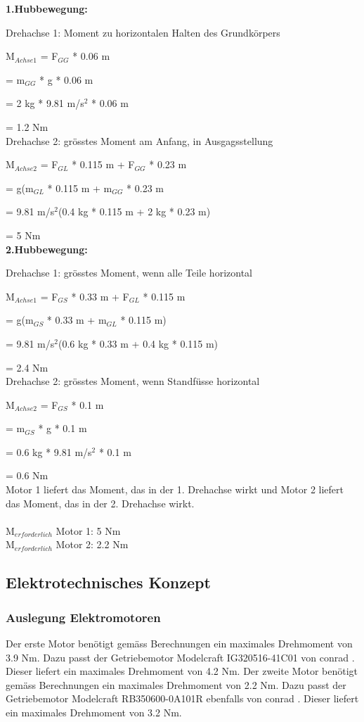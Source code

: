 \textbf{1.Hubbewegung:}

Drehachse 1: Moment zu horizontalen Halten des Grundkörpers

M$_{Achse 1}$ = F$_{GG}$ * 0.06 m

= m$_{GG}$ * g * 0.06 m

= 2 kg * 9.81 m/s$^{2}$ * 0.06 m

= 1.2 Nm\\

Drehachse 2: grösstes Moment am Anfang, in Ausgagsstellung

M$_{Achse 2}$ = F$_{GL}$ * 0.115 m + F$_{GG}$ * 0.23 m

= g(m$_{GL}$ * 0.115 m + m$_{GG}$ * 0.23 m

= 9.81 m/s$^{2}$(0.4 kg * 0.115 m + 2 kg * 0.23 m)

= 5 Nm\\

\textbf{2.Hubbewegung:}

Drehachse 1: grösstes Moment, wenn alle Teile horizontal

M$_{Achse 1}$ = F$_{GS}$ * 0.33 m + F$_{GL}$ * 0.115 m

= g(m$_{GS}$ * 0.33 m + m$_{GL}$ * 0.115 m)

= 9.81 m/s$^{2}$(0.6 kg * 0.33 m + 0.4 kg * 0.115 m)

= 2.4 Nm\\

Drehachse 2: grösstes Moment, wenn Standfüsse horizontal

M$_{Achse 2}$ = F$_{GS}$ * 0.1 m

= m$_{GS}$ * g * 0.1 m

= 0.6 kg * 9.81 m/s$^{2}$ * 0.1 m

= 0.6 Nm\\

Motor 1 liefert das Moment, das in der 1. Drehachse wirkt und Motor 2 liefert das Moment, das in der 2. Drehachse wirkt.\\
\\
M$_{erforderlich}$ Motor 1: 5 Nm\\

M$_{erforderlich}$ Motor 2: 2.2 Nm


\subsection{Elektrotechnisches Konzept}
\subsubsection{Auslegung Elektromotoren}
Der erste Motor benötigt gemäss Berechnungen ein maximales Drehmoment von 3.9 Nm. Dazu passt der Getriebemotor Modelcraft IG320516-41C01 von conrad \cite{Getriebemotor1}. Dieser liefert ein maximales Drehmoment von 4.2 Nm. 
Der zweite Motor benötigt gemäss Berechnungen ein maximales Drehmoment von 2.2 Nm. Dazu passt der Getriebemotor Modelcraft RB350600-0A101R ebenfalls von conrad \cite{Getriebemotor2}. Dieser liefert ein maximales Drehmoment von 3.2 Nm.

